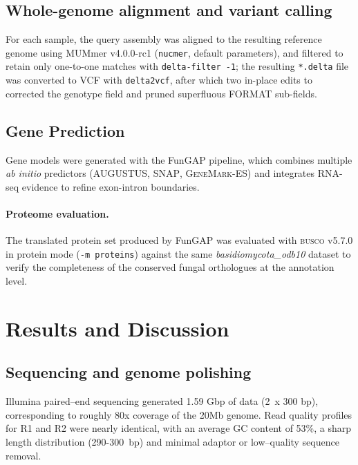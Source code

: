 \documentclass[Journal,letterpaper]{ascelike-new}
\begin{document}
\subsection*{Whole-genome alignment and variant calling}

For each sample, the query assembly was aligned to the resulting reference genome using MUMmer v4.0.0-rc1 (\verb|nucmer|, default parameters), and filtered to retain only one-to-one matches with \verb|delta-filter -1|; the resulting \texttt{*.delta} file was converted to VCF with \verb|delta2vcf|, after which two in-place edits to corrected the genotype field and pruned superfluous FORMAT sub-fields.

\subsection*{Gene Prediction}

Gene models were generated with the FunGAP pipeline, which combines multiple \textit{ab initio} predictors (\textsc{AUGUSTUS}, \textsc{SNAP}, \textsc{GeneMark-ES}) and integrates RNA-seq evidence to refine exon-intron boundaries.

\paragraph{Proteome evaluation.} The translated protein set produced by FunGAP was evaluated with \textsc{busco} v5.7.0 in protein mode (\texttt{-m proteins}) against the same \textit{basidiomycota\_odb10} dataset to verify the completeness of the conserved fungal orthologues at the annotation level.


 \section*{Results and Discussion}

 \subsection*{Sequencing and genome polishing}

Illumina paired--end sequencing generated 1.59 Gbp of data (2~x 300 bp), corresponding to roughly 80x coverage of the 20Mb genome. Read quality profiles for R1 and R2 were nearly identical, with an average GC content of 53\%, a sharp length distribution (290-300~bp) and minimal adaptor or low--quality sequence removal.
\end{document}
